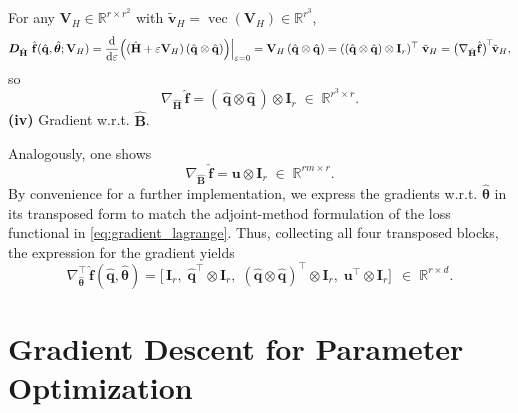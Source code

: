 For any $\mathbf{V}_H\in\mathbb{R}^{r\times r^2}$ with $\tilde{\mathbf{v}}_H=\operatorname{vec}(\mathbf{V}_H)\in\mathbb{R}^{r^3}$,\\
$$\bm{D}_{\hat{\mathbf{H}}}~\hat{\mathbf{f}}(\hat{\mathbf{q}},\hat{\bm{\theta}};\mathbf{V}_H)=\dv{}{\varepsilon}\Bigl((\hat{\mathbf{H}}+\varepsilon\mathbf{V}_H)\,(\hat{\mathbf{q}}\otimes\hat{\mathbf{q}})\Bigr)\Big|_{\varepsilon=0}=\mathbf{V}_H\,(\hat{\mathbf{q}}\otimes\hat{\mathbf{q}})=((\hat{\mathbf{q}}\otimes\hat{\mathbf{q}})\otimes\mathbf{I}_r)^{\top}\;\tilde{\mathbf{v}}_H=\bigl(\nabla_{\hat{\mathbf{H}}}\hat{\mathbf{f}}\bigr)^{\!\top}\!\tilde{\mathbf{v}}_H,$$
so\\
$$\nabla_{\hat{\mathbf{H}}}\,\hat{\mathbf{f}}=(\,\hat{\mathbf{q}}\otimes\hat{\mathbf{q}}\,)\otimes\mathbf{I}_r\;\in\;\mathbb{R}^{r^3\times r}.$$
\noindent\textbf{(iv)} Gradient w.r.t. $\hat{\mathbf{B}}$.

Analogously, one shows\\
$$\nabla_{\hat{\mathbf{B}}}\,\hat{\mathbf{f}}=\mathbf{u}\otimes\mathbf{I}_r\;\in\;\mathbb{R}^{rm\times r}.$$
By convenience for a further implementation, we express the gradients w.r.t. $\hat{\bm{\theta}}$ in its transposed form to match the adjoint-method formulation of the loss functional in \eqref{eq:gradient_lagrange}.
Thus, collecting all four transposed blocks, the expression for the gradient yields\\
\begin{equation}
  \label{eq:gradient_2}
  \nabla_{\hat{\bm{\theta}}}^{\top}\,\hat{\mathbf{f}}(\hat{\mathbf{q}},\hat{\bm{\theta}})=\bigl[\,\mathbf{I}_r,\;\hat{\mathbf{q}}^{\!\top}\otimes\mathbf{I}_r,\;(\hat{\mathbf{q}}\otimes\hat{\mathbf{q}})^{\!\top}\otimes\mathbf{I}_r,\;\mathbf{u}^{\!\top}\otimes\mathbf{I}_r\bigr]~~\in\;\mathbb{R}^{r\times d}.
\end{equation}


\section{Gradient Descent for Parameter Optimization}
\label{sec:gd_opt}

